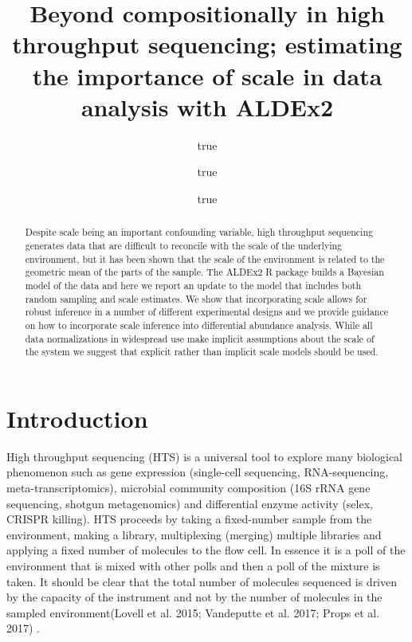 \documentclass[
]{article}
\title{Beyond compositionally in high throughput sequencing; estimating
the importance of scale in data analysis with ALDEx2}
\author{true \and true \and true}
\date{}
\begin{document}
\maketitle
\begin{abstract}
Despite scale being an important confounding variable, high throughput
sequencing generates data that are difficult to reconcile with the scale
of the underlying environment, but it has been shown that the scale of
the environment is related to the geometric mean of the parts of the
sample. The ALDEx2 R package builds a Bayesian model of the data and
here we report an update to the model that includes both random sampling
and scale estimates. We show that incorporating scale allows for robust
inference in a number of different experimental designs and we provide
guidance on how to incorporate scale inference into differential
abundance analysis. While all data normalizations in widespread use make
implicit assumptions about the scale of the system we suggest that
explicit rather than implicit scale models should be used.
\end{abstract}

\hypertarget{introduction}{%
\section{Introduction}\label{introduction}}

High throughput sequencing (HTS) is a universal tool to explore many
biological phenomenon such as gene expression (single-cell sequencing,
RNA-sequencing, meta-transcriptomics), microbial community composition
(16S rRNA gene sequencing, shotgun metagenomics) and differential enzyme
activity (selex, CRISPR killing). HTS proceeds by taking a fixed-number
sample from the environment, making a library, multiplexing (merging)
multiple libraries and applying a fixed number of molecules to the flow
cell. In essence it is a poll of the environment that is mixed with
other polls and then a poll of the mixture is taken. It should be clear
that the total number of molecules sequenced is driven by the capacity
of the instrument and not by the number of molecules in the sampled
environment(Lovell et al. 2015; Vandeputte et al. 2017; Props et al.
2017) .
\end{document}
